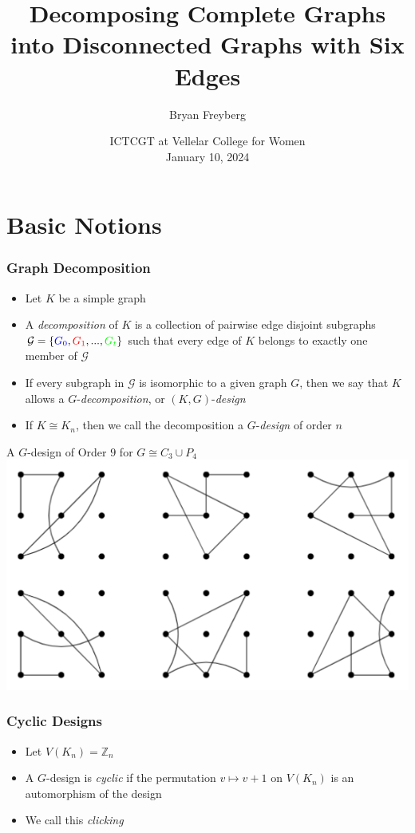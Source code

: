 \documentclass[11pt,serif,professionalfont,aspectratio=169]{beamer}
\title[]{Decomposing Complete Graphs into Disconnected Graphs with Six Edges} %
\author{Bryan Freyberg} %
\institute[UMD] %
{
University of Minnesota Duluth, USA \\ %
\medskip
\texttt{frey0031@d.umn.edu} %
}
\date{ICTCGT at Vellelar College for Women\\ January 10, 2024}
\theoremstyle{plain}
\begin{document}
\begin{frame}
\titlepage %

\end{frame}
\section{Basic Notions}
\begin{frame}
\frametitle{Graph Decomposition}
\begin{itemize}
\item Let $K$ be a simple graph
\pause
\item A \emph{decomposition} of $K$ is a collection of pairwise edge disjoint subgraphs  $\mathcal{G}=\{\textcolor{blue}{G_0},\textcolor{red}{G_1},...,\textcolor{green}{G_t}\}$ such that every edge of $K$ belongs to exactly one member of $\mathcal{G}$
\pause
\item If every subgraph in $\mathcal{G}$ is isomorphic to a given graph $G$, then we say that $K$ allows a $G$-\emph{decomposition}, or $(K,G)$-\emph{design}
\pause
\item If $K\cong K_n$, then we call the decomposition a $G$-\emph{design} of order $n$
\end{itemize}
\end{frame}
\begin{frame}{A $G$-design of Order $9$ for $G\cong C_3 \cup P_4$}
    \centering
    \includegraphics[scale=1.0]{K9.PNG}
\end{frame}
\begin{frame}
\frametitle{Cyclic Designs}
\begin{itemize}
\item Let $V(K_n)=\mathbb{Z}_n$ 
\item A $G$-design is \emph{cyclic} if the permutation $v\mapsto v+1$ on $V(K_n)$ is an automorphism of the design
\item We call this \emph{clicking}
\end{itemize}
\end{frame}
\end{document}
